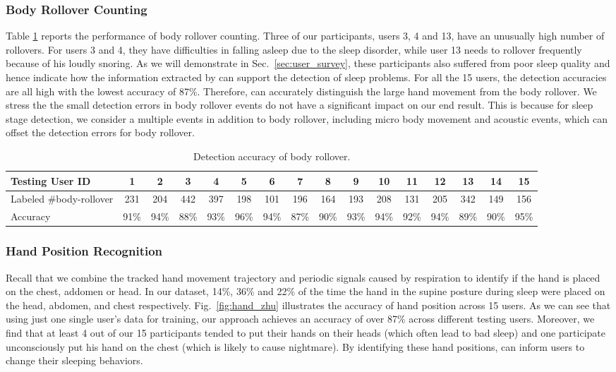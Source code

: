 \subsubsection{Body Rollover Counting}
Table \ref{tab:rollver} reports the performance of body rollover counting. Three of our participants, users 3, 4 and 13, have an unusually
high number of rollovers. For users 3 and 4, they have difficulties in falling asleep due to the sleep disorder, while user 13 needs to
rollover frequently because of his loudly snoring. As we will demonstrate in Sec.~\ref{sec:user_survey}, these participants also suffered
from poor sleep quality and hence indicate how the information extracted by {\systemname} can support the detection of sleep problems. For
all the 15 users, the detection accuracies are all high with the lowest accuracy of 87\%. Therefore, {\systemname} can accurately
distinguish the large hand movement from the body rollover. We stress the the small detection errors in body rollover events do not have a
significant impact on our end result. This is because for sleep stage detection, we consider a multiple events in addition to body
rollover, including micro body movement and acoustic events, which can offset the detection errors for body rollover.

\begin{table}[!t]\footnotesize
  \caption{Detection accuracy of body rollover.}\label{tab:rollver}
  \setlength{\tabcolsep}{3pt}
\renewcommand{\arraystretch}{0.67}{\multirowsetup}{\centering}
        \begin{tabular}{lccccccccccccccc}
        \toprule
         \textbf{Testing User ID}    & 1& 2  & 3& 4& 5& 6& 7& 8& 9& 10& 11& 12& 13& 14& 15\\
        \midrule
            \rowcolor{Gray} {Labeled \#body-rollover}  &231&204&442&397&198&101&196&164&193&208&131&205&342&149&156 \\
                 {Accuracy} &91\%& 94\% &88\%&93\%&96\%&94\%&87\%&90\% &93\% &94\% &92\% &94\% &89\% &90\% &95\%\\
        \bottomrule
 \end{tabular}
\end{table}

\subsubsection{Hand Position Recognition}
Recall that we combine the tracked hand movement trajectory and periodic signals caused by respiration to identify if the hand is placed on
the chest, addomen or head. In our dataset, 14\%, 36\% and 22\% of the time the hand in the supine posture during sleep were placed on the
head, abdomen, and chest respectively. Fig.~\ref{fig:hand_zhu} illustrates the accuracy of hand position across 15 users. As we can see
that using just one single user's data for training, our approach achieves an accuracy of over 87\% across different testing users.
Moreover, we find that at least 4 out of our 15 participants tended to put their hands on their heads (which often lead to bad sleep) and
one participate unconsciously put his hand on the chest (which is likely to cause nightmare). By identifying these hand positions,
\systemname can inform users to change their sleeping behaviors.

